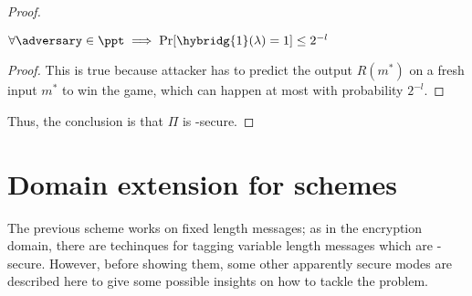 \begin{proof}
\begin{cryptoredux}
        \cseqbeginloop
        \cseqendloop

        \cseqdelay
    

        \cseqdelay

        
    \end{cryptoredux}

    \begin{lemma}
        $\forall \adversary \in \ppt \implies \Pr[\hybridg{1}(\lambda) = 1] \leq 2^{-l}$
    \end{lemma}

    \begin{proof}
        This is true because attacker has to predict the output $R(m^*)$ on a fresh input $m^*$ to win the game, which can happen at most with probability $2^{-l}$.
    \end{proof}

    Thus, the conclusion is that $\Pi$ is \ufcma-secure.
\end{proof}


\section{Domain extension for \mac{} schemes}

The previous scheme works on fixed length messages; as in the encryption domain, there are techinques for tagging variable length messages which are \ufcma-secure. However, before showing them, some other apparently secure modes are described here to give some possible insights on how to tackle the problem. 

